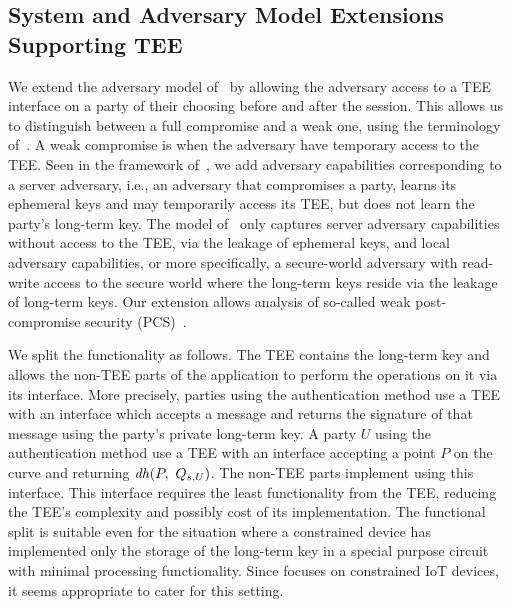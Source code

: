 \documentclass[runningheads]{llncs}
\begin{document}
\subsection{System and Adversary Model Extensions Supporting TEE}
\label{sec:TEE:advModel}
%
We extend the adversary model of~\cite{Norr21} by allowing the adversary
access to a TEE interface on a party of their choosing before and after the
\mEdhoc{} session.
%
This allows us to distinguish between a full compromise and a weak one, using
the terminology of~\cite{DBLP:conf/csfw/Cohn-GordonCG16}.
%
A weak compromise is when the adversary have temporary access to the TEE.
%
Seen in the framework of~\cite{DBLP:conf/icics/XuZRWTZ20}, we add adversary
capabilities corresponding to a server adversary, i.e., an adversary that
compromises a party, learns its ephemeral keys and may temporarily access its
TEE, but does not learn the party's long-term key.
%
The model of~\cite{Norr21} only captures server adversary capabilities without
access to the TEE, via the leakage of ephemeral keys, and local adversary
capabilities, or more specifically, a secure-world adversary with read-write
access to the
secure world where the long-term keys reside via the leakage of long-term keys.
%
Our extension allows analysis of so-called weak post-compromise security
(PCS)~\cite{DBLP:conf/csfw/Cohn-GordonCG16}.
%

We split the \mEdhoc{} functionality as follows.
%
The TEE contains the long-term key and allows the non-TEE parts of the
application to perform the operations on it via its interface.
%
More precisely, parties using the \mSig{} authentication method use a TEE with
an interface which accepts a message and returns the signature of that message
using the party's private long-term key.
%
A party $U$ using the \mStat{} authentication method use a TEE with an interface
accepting a point $P$ on the curve and returning $\mDH(P,\ \mGu{})$.
%
%
The non-TEE parts implement \mEdhoc{} using this interface.
%
This interface requires the least functionality from the TEE, reducing the TEE's
complexity and possibly cost of its implementation.
%
The functional split is suitable even for the situation where a
constrained device has implemented only the storage of the long-term key in a
special purpose circuit with minimal processing functionality.
%
Since \mEdhoc{} focuses on constrained IoT devices, it seems appropriate to
cater for this setting.
%
\end{document}

